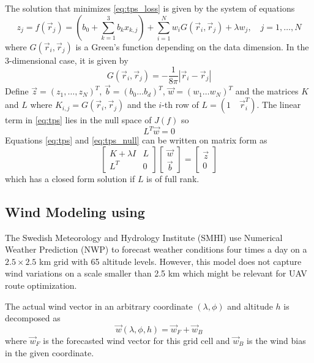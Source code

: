 The solution that minimizes \eqref{eq:tps_loss} is given by the system of equations
\begin{equation}\label{eq:tps}
    z_j = f(\vec{r}_j) =   \left( b_0 + \sum_{k=1}^3 b_kx_{k,j} \right) +\sum_{i=1}^Nw_iG(\vec{r}_i,\vec{r}_j)+ \lambda w_j, \quad j=1,\ldots,N
\end{equation}
where $G(\vec{r}_i,\vec{r}_j)$ is a Green's function depending on the data dimension. In the 3-dimensional case, it is given by
\begin{equation}
    G(\vec{r}_i,\vec{r}_j)=-\frac{1}{8\pi}|\vec{r}_i-\vec{r}_j|
\end{equation}
Define $\vec{z}=(z_1,\ldots,z_N)^T$, $\vec{b}=(b_0 \ldots b_d)^T$, $\vec{w}=(w_1 \ldots w_N)^T$ and the matrices $K$ and $L$ where $K_{i,j}=G(\vec{r}_i,\vec{r}_j)$ and the $i$-th row of $L=(1\quad \vec{r}_i^T)$. The linear term in \eqref{eq:tps} lies in the null space of $J(f)$ so 
\begin{equation}\label{eq:tps_null}
    L^T\vec{w}=0
\end{equation}
Equations \eqref{eq:tps} and \eqref{eq:tps_null} can be written on matrix form as
\begin{equation}\label{eq:tps_closed_form}
    \begin{bmatrix}
        K+\lambda I & L \\
        L^T & 0
    \end{bmatrix}
    \begin{bmatrix}
        \vec{w} \\
        \vec{b}
    \end{bmatrix}
    =
    \begin{bmatrix}
        \vec{z} \\
        0
    \end{bmatrix}
\end{equation}
which has a closed form solution if $L$ is of full rank.
\subsection{Wind Modeling using \abbrTPS}
The Swedish Meteorology and Hydrology Institute (SMHI) use Numerical Weather Prediction (NWP) to forecast weather conditions four times a day on a $2.5\times2.5$ km grid with 65 altitude levels. However, this model does not capture wind variations on a scale smaller than 2.5 km which might be relevant for UAV route optimization.

The actual wind vector in an arbitrary coordinate $(\lambda,\phi)$ and altitude $h$ is decomposed as 
\begin{equation}
    \vec{w}(\lambda,\phi,h)=\vec{w}_F + \vec{w}_B
\end{equation}
where $\vec{w}_F$ is the forecasted wind vector for this grid cell and $\vec{w}_B$ is the wind bias in the given coordinate.

